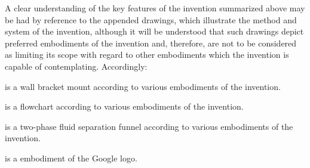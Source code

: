 
\npar A clear understanding of the key features of the invention summarized above may be had 
by reference to the appended drawings, which illustrate the method and system of the 
invention, although it will be understood that such drawings depict preferred 
embodiments of the invention and, therefore, are not to be considered as limiting its 
scope with regard to other embodiments which the invention is capable of contemplating. 
Accordingly:

\npar {} is a wall bracket mount according to various embodiments of the invention.

\npar {} is a flowchart according to various embodiments of the invention.

\npar {} is a two-phase fluid separation funnel according to various embodiments of the invention.

\npar {} is a embodiment of the Google logo.

